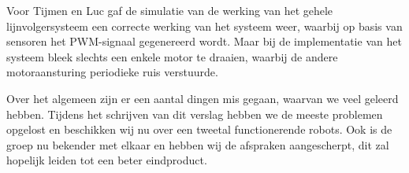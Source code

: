 \documentclass{report}
\begin{document}
Voor Tijmen en Luc gaf de simulatie van de werking van het gehele lijnvolgersysteem een correcte werking van het systeem weer, waarbij op basis van sensoren het PWM-signaal gegenereerd wordt. Maar bij de implementatie van het systeem bleek slechts een enkele motor te draaien, waarbij de andere motoraansturing periodieke ruis verstuurde.

Over het algemeen zijn er een aantal dingen mis gegaan, waarvan we veel geleerd hebben. Tijdens het schrijven van dit verslag hebben we de meeste problemen opgelost en beschikken wij nu over een tweetal functionerende robots. Ook is de groep nu bekender met elkaar en hebben wij de afspraken aangescherpt, dit zal hopelijk leiden tot een beter eindproduct. 
\end{document}
